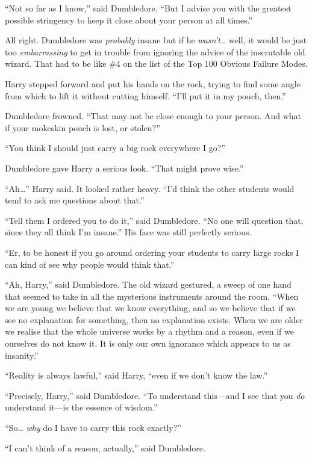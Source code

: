 ``Not so far as I know,'' said Dumbledore. ``But I advise you with the
greatest possible stringency to keep it close about your person at all
times.''

All right. Dumbledore was \emph{probably} insane but if he
\emph{wasn't}\ldots{} well, it would be just too \emph{embarrassing} to
get in trouble from ignoring the advice of the inscrutable old wizard.
That had to be like \#4 on the list of the Top 100 Obvious Failure
Modes.

Harry stepped forward and put his hands on the rock, trying to find some
angle from which to lift it without cutting himself. ``I'll put it in my
pouch, then.''

Dumbledore frowned. ``That may not be close enough to your person. And
what if your mokeskin pouch is lost, or stolen?''

``You think I should just carry a big rock everywhere I go?''

Dumbledore gave Harry a serious look. ``That might prove wise.''

``Ah\ldots{}'' Harry said. It looked rather heavy. ``I'd think the other
students would tend to ask me questions about that.''

``Tell them I ordered you to do it,'' said Dumbledore. ``No one will
question that, since they all think I'm insane.'' His face was still
perfectly serious.

``Er, to be honest if you go around ordering your students to carry
large rocks I can kind of see why people would think that.''

``Ah, Harry,'' said Dumbledore. The old wizard gestured, a sweep of one
hand that seemed to take in all the mysterious instruments around the
room. ``When we are young we believe that we know everything, and so we
believe that if we see no explanation for something, then no explanation
exists. When we are older we realise that the whole universe works by a
rhythm and a reason, even if we ourselves do not know it. It is only our
own ignorance which appears to us as insanity.''

``Reality is always lawful,'' said Harry, ``even if we don't know the
law.''

``Precisely, Harry,'' said Dumbledore. ``To understand this---and I see
that you \emph{do} understand it---is the essence of wisdom.''

``So\ldots{} \emph{why} do I have to carry this rock exactly?''

``I can't think of a reason, actually,'' said Dumbledore.


